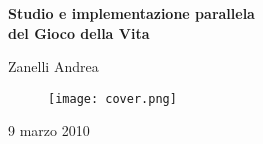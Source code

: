 \thispagestyle{empty}

\begin{titlepage}
\begin{center}

\vspace{5mm}

\LARGE{\textbf{Studio e implementazione parallela\\}}
\LARGE{\textbf{del Gioco della Vita}}

\vspace{5mm}

\Large{Zanelli Andrea}

\vspace{32mm}

\begin{figure}[htbp]
\begin{center}
\texttt{[image: cover.png]}
\end{center}
\end{figure}

\vspace{32mm}

\Large{9 marzo 2010}

\end{center}
\end{titlepage}
